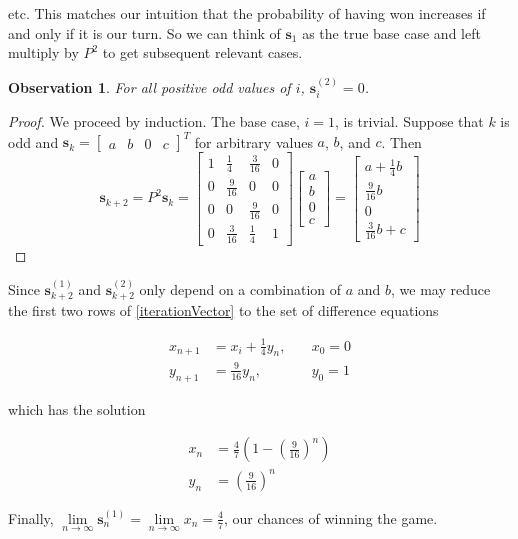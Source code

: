 \documentclass[]{article}
\newtheorem*{obs}{Observation}
\begin{document}
etc. This matches our intuition that the probability of having won increases if and only if it is our turn. So we can think of $\mathbf{s}_1$ as the true base case and left multiply by $P^2$ to get subsequent relevant cases.

\begin{obs}
	For all positive odd values of $i$, $\mathbf{s}_i^{(2)}=0$.
\end{obs}
\begin{proof}
	We proceed by induction. The base case, $i=1$, is trivial. Suppose that $k$ is odd and $\mathbf{s}_k = \begin{bmatrix}a & b & 0 & c\end{bmatrix}^T$ for arbitrary values $a$, $b$, and $c$. Then
	\begin{equation}\label{iterationVector}
	\mathbf{s}_{k+2} = P^2 \mathbf{s}_k =
	\begin{bmatrix}
	1 & \frac{1}{4} & \frac{3}{16} & 0\\
	0 & \frac{9}{16} & 0 & 0\\
	0 & 0 & \frac{9}{16} & 0\\
	0 & \frac{3}{16} & \frac{1}{4} & 1
	\end{bmatrix}
	\begin{bmatrix}a\\ b\\ 0\\ c \end{bmatrix} = 
	\begin{bmatrix}
	a + \frac{1}{4}b\\
	\frac{9}{16}b\\ 0\\
	\frac{3}{16}b + c
	\end{bmatrix}
	\end{equation}
\end{proof}

Since $\mathbf{s}_{k+2}^{(1)}$ and $\mathbf{s}_{k+2}^{(2)}$ only depend on a combination of $a$ and $b$, we may reduce the first two rows of \eqref{iterationVector} to the set of difference equations

\begin{equation}\begin{aligned}
x_{n+1} &= x_i + \frac{1}{4}y_n, \quad &x_0 = 0\\
y_{n+1} &= \frac{9}{16}y_n, \quad &y_0 = 1
\end{aligned}\end{equation}

which has the solution 

\begin{equation}\begin{aligned}
x_{n} &= \frac{4}{7} \left(1 - \left(\frac{9}{16}\right)^n\right)\\
y_{n} &= \left(\frac{9}{16}\right)^n
\end{aligned}\end{equation}

Finally, $\lim\limits_{n \rightarrow\infty} \mathbf{s}_n^{(1)} = \lim\limits_{n\rightarrow\infty} x_{n} = \frac{4}{7}$, our chances of winning the game.
\end{document}
